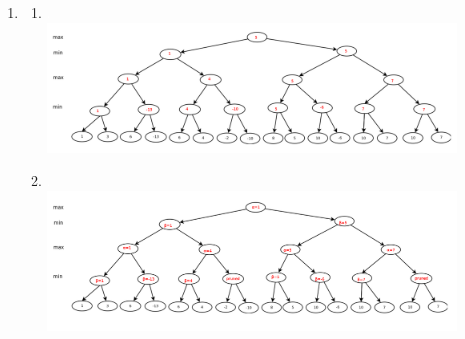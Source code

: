 \documentclass{article}
\begin{document}
\fancyhfoffset[L]{0cm}
\fancyhfoffset[R]{0cm}


\begin{enumerate}
    \setcounter{enumi}{0}
    \item
    \begin{enumerate}
        \item
            \textcolor{white}{.}\vspace{-12pt}\\
            \includegraphics[width=0.9\textwidth]{P1a}

        \item 
            \textcolor{white}{.}\vspace{-12pt}\\
            \includegraphics[width=0.9\textwidth]{P1b}
    \end{enumerate}
\end{enumerate}
\end{document}
